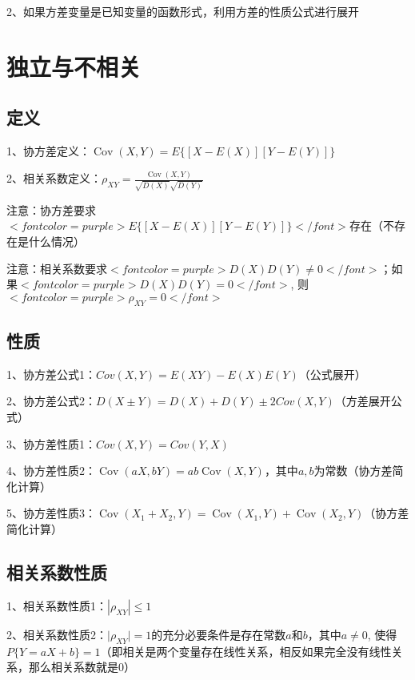 2、如果方差变量是已知变量的函数形式，利用方差的性质公式进行展开

\section{独立与不相关}



\subsection{定义}

1、协方差定义：$ \operatorname{Cov}(X, Y)=E\{[X-E(X)][Y-E(Y)]\} $

2、相关系数定义：$ \rho_{X Y}=\frac{\operatorname{Cov}(X, Y)}{\sqrt{D(X)} \sqrt{D(Y)}} $

注意：协方差要求$ <font color=purple>E\{[X-E(X)][Y-E(Y)]\}</font> $存在（不存在是什么情况）

注意：相关系数要求$ <font color=purple>D(X) D(Y) \neq 0</font> $；如果$ <font color=purple>D(X) D(Y)=0</font> $, 则$ <font color=purple>\rho_{X Y}=0</font> $



\subsection{性质}

1、协方差公式1：$ C o v ( X , Y ) = E ( X Y ) - E ( X ) E ( Y )  $（公式展开）

2、协方差公式2：$ D ( X \pm Y ) = D ( X ) + D ( Y ) \pm 2 Cov ( X , Y )   $（方差展开公式）

3、协方差性质1：$ Cov(X, Y)=Cov(Y, X) $

4、协方差性质2：$ \operatorname{Cov}(a X, b Y)=a b \operatorname{Cov}(X, Y) $，其中$ a,b $为常数（协方差简化计算）

5、协方差性质3：$ \operatorname{Cov}\left(X_{1}+X_{2}, Y\right)=\operatorname{Cov}\left(X_{1}, Y\right)+\operatorname{Cov}\left(X_{2}, Y\right) $（协方差简化计算）



\subsection{相关系数性质}

1、相关系数性质1：$ \left|\rho_{X Y}\right| \leqslant 1 $

2、相关系数性质2：$ \mid \rho_{X Y} \mid=1 $的充分必要条件是存在常数$ a $和$ b $，其中$ a \neq 0 $, 使得$ P\{Y=a X+b\}=1 $（即相关是两个变量存在线性关系，相反如果完全没有线性关系，那么相关系数就是0）




